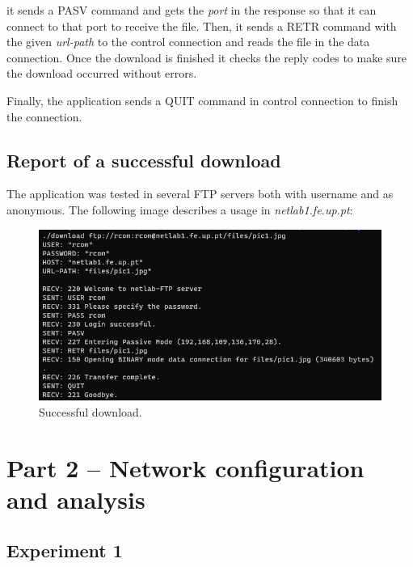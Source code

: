 \documentclass[a4paper,11pt,english]{article}
\begin{document}
        \noindent it sends a PASV command and gets the \textit{port} in the response so that it can connect
        to that port to receive the file. Then, it sends a RETR command with the given \textit{url-path} to
        the control connection and reads the file in the data connection. Once the download is finished it checks
        the reply codes to make sure the download occurred without errors.

        \noindent Finally, the application sends a QUIT command in control connection to finish the connection.


    \subsection{Report of a successful download}
        The application was tested in several FTP servers both with username and as anonymous. The
        following image describes a usage in \textit{netlab1.fe.up.pt}:

        \begin{figure}[H]
            \centering
            \includegraphics[scale=0.4]{./imgs/download.png}
            \caption{Successful download.}
            \label{fig:download}
        \end{figure}


\section{Part 2 -- Network configuration and analysis}

    \subsection{Experiment 1}
\end{document}
